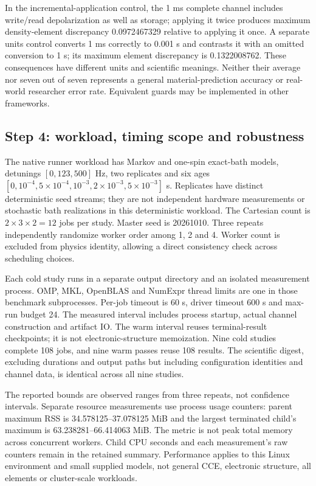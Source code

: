 \documentclass[10pt,a4paper]{article}
\begin{document}
In the incremental-application control, the 1 ms complete channel includes write/read depolarization as well as storage; applying it twice produces maximum density-element discrepancy 0.0972467329 relative to applying it once. A separate units control converts 1 ms correctly to 0.001 s and contrasts it with an omitted conversion to 1 s; its maximum element discrepancy is 0.1322008762. These consequences have different units and scientific meanings. Neither their average nor seven out of seven represents a general material-prediction accuracy or real-world researcher error rate. Equivalent guards may be implemented in other frameworks.

\subsection{Step 4: workload, timing scope and robustness}
The native runner workload has Markov and one-spin exact-bath models, detunings $[0,123,500]$ Hz, two replicates and six ages $[0,10^{-4},5\times10^{-4},10^{-3},2\times10^{-3},5\times10^{-3}]$ s. Replicates have distinct deterministic seed streams; they are not independent hardware measurements or stochastic bath realizations in this deterministic workload. The Cartesian count is $2\times3\times2=12$ jobs per study. Master seed is 20261010. Three repeats independently randomize worker order among 1, 2 and 4. Worker count is excluded from physics identity, allowing a direct consistency check across scheduling choices.

Each cold study runs in a separate output directory and an isolated measurement process. OMP, MKL, OpenBLAS and NumExpr thread limits are one in those benchmark subprocesses. Per-job timeout is 60 s, driver timeout 600 s and max-run budget 24. The measured interval includes process startup, actual channel construction and artifact IO. The warm interval reuses terminal-result checkpoints; it is not electronic-structure memoization. Nine cold studies complete 108 jobs, and nine warm passes reuse 108 results. The scientific digest, excluding durations and output paths but including configuration identities and channel data, is identical across all nine studies.


The reported bounds are observed ranges from three repeats, not confidence intervals. Separate resource measurements use process usage counters: parent maximum RSS is 34.578125--37.078125 MiB and the largest terminated child's maximum is 63.238281--66.414063 MiB. The metric is not peak total memory across concurrent workers. Child CPU seconds and each measurement's raw counters remain in the retained summary. Performance applies to this Linux environment and small supplied models, not general CCE, electronic structure, all elements or cluster-scale workloads.
\end{document}
